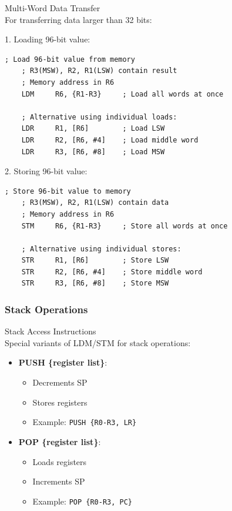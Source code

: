\begin{KR}{Multi-Word Data Transfer}\\
For transferring data larger than 32 bits:

1. Loading 96-bit value:
\begin{lstlisting}[language=armasm, style=basesmol]
    ; Load 96-bit value from memory
    ; R3(MSW), R2, R1(LSW) contain result
    ; Memory address in R6
    LDM     R6, {R1-R3}     ; Load all words at once
    
    ; Alternative using individual loads:
    LDR     R1, [R6]        ; Load LSW
    LDR     R2, [R6, #4]    ; Load middle word
    LDR     R3, [R6, #8]    ; Load MSW
\end{lstlisting}

2. Storing 96-bit value:
\begin{lstlisting}[language=armasm, style=basesmol]
    ; Store 96-bit value to memory
    ; R3(MSW), R2, R1(LSW) contain data
    ; Memory address in R6
    STM     R6, {R1-R3}     ; Store all words at once
    
    ; Alternative using individual stores:
    STR     R1, [R6]        ; Store LSW
    STR     R2, [R6, #4]    ; Store middle word
    STR     R3, [R6, #8]    ; Store MSW
\end{lstlisting}
\end{KR}

\subsubsection{Stack Operations}

\begin{concept}{Stack Access Instructions}\\
Special variants of LDM/STM for stack operations:
\begin{itemize}
  \item \textbf{PUSH \{register list\}}:
    \begin{itemize}
      \item Decrements SP
      \item Stores registers
      \item Example: \texttt{PUSH \{R0-R3, LR\}}
    \end{itemize}
  \item \textbf{POP \{register list\}}:
    \begin{itemize}
      \item Loads registers
      \item Increments SP
      \item Example: \texttt{POP \{R0-R3, PC\}}
    \end{itemize}
\end{itemize}
\end{concept}

